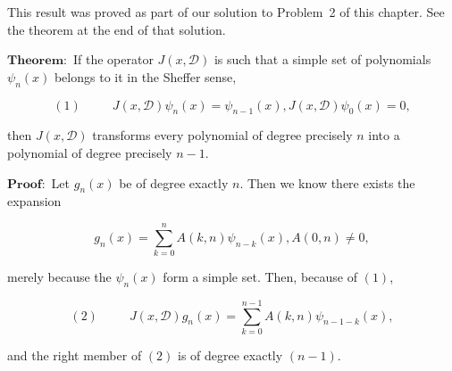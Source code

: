 \begin{solution}
This result was proved as part of our solution to Problem~2 of this chapter. See the theorem at the end of that solution.

$\mathbf{Theorem:}$ If the operator $J(x, \mathscr{D})$ is such that a simple set of polynomials $\psi_n(x)$ belongs to it in the Sheffer sense,

$$(1) \hspace{30pt} J(x,\mathscr{D}) \psi_n(x) = \psi_{n-1}(x), J(x,\mathscr{D}) \psi_0(x) = 0,$$

then $J(x ,\mathscr{D})$ transforms every polynomial of degree precisely $n$ into a polynomial of degree precisely $n-1$.

$\mathbf{Proof:}$ Let $g_n(x)$ be of degree exactly $n$. Then we know there exists the expansion

$$g_n(x)=\displaystyle\sum_{k=0}^n A(k,n) \psi_{n-k}(x), A(0,n) \neq 0,$$

merely because the $\psi_n(x)$ form a simple set. Then, because of $(1)$,

$$(2) \hspace{30pt} J(x,\mathscr{D}) g_n(x) = \displaystyle\sum_{k=0}^{n-1} A(k,n) \psi_{n-1-k}(x),$$

and the right member of $(2)$ is of degree exactly $(n-1).$
\end{solution}